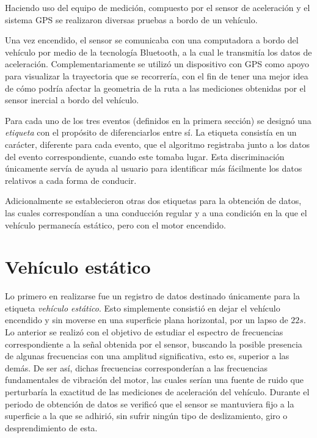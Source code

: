 Haciendo uso del equipo de medición, compuesto por el sensor de aceleración y el sistema GPS se realizaron diversas pruebas a bordo de un vehículo.



Una vez encendido, el sensor se comunicaba con una computadora a bordo del vehículo por medio de la tecnología Bluetooth, a la cual le transmitía los datos de aceleración.
Complementariamente se utilizó un dispositivo con GPS como apoyo para visualizar la trayectoria que se recorrería, con el fin de tener una mejor idea de cómo podría afectar la geometria de la ruta a las mediciones obtenidas por el sensor inercial a bordo del vehículo.

Para cada uno de los tres eventos (definidos en la primera sección) se designó una {\em etiqueta} con el propósito de diferenciarlos entre sí.
La etiqueta consistía en un carácter, diferente para cada evento, que el algoritmo registraba junto a los datos del evento correspondiente, cuando este tomaba lugar. 
Esta discriminación únicamente servía de ayuda al usuario para identificar más fácilmente los datos relativos a cada forma de conducir.

Adicionalmente se establecieron otras dos etiquetas para la obtención de datos, las cuales correspondían a una conducción regular y a una condición en la que el vehículo permanecía estático, pero con el motor encendido.
 
\section{Vehículo estático}

Lo primero en realizarse fue un registro de datos destinado únicamente para la etiqueta {\em vehículo estático}. 
Esto simplemente consistió en dejar el vehículo encendido y sin moverse en una superficie plana horizontal, por un lapso de $22s$.
Lo anterior se realizó con el objetivo de estudiar el espectro de frecuencias correspondiente a la señal obtenida por el sensor, buscando la posible presencia de algunas frecuencias con una amplitud significativa, esto es, superior a las demás. 
De ser así, dichas frecuencias corresponderían a las frecuencias fundamentales de vibración del motor, las cuales serían una fuente de ruido que perturbaría la exactitud de las mediciones de aceleración del vehículo. 
Durante el periodo de obtención de datos se verificó que el sensor se mantuviera fijo a la superficie a la que se adhirió, sin sufrir ningún tipo de deslizamiento, giro o desprendimiento de esta.

